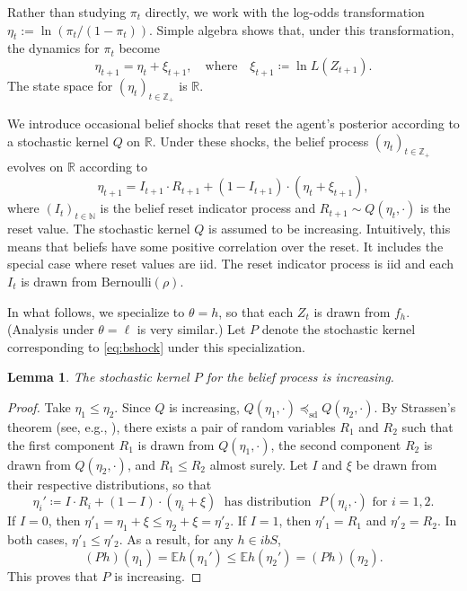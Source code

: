 \documentclass[12pt,reqno]{amsart}
\numberwithin{equation}{section}
\newtheorem{lemma}{Lemma}[section]
\theoremstyle{definition}
\newcommand{\1}{\mathbbm{1}}
\newcommand{\RR}{\mathbb{R}}
\newcommand{\NN}{\mathbb{N}}
\newcommand{\ZZ}{\mathbb{Z}}
\newcommand{\EE}{\mathbb E}
\newcommand{\precsd}{\preceq_{\textrm{sd}}}
\begin{document}
Rather than studying $\pi_t$ directly, we work with 
the log-odds transformation
$\eta_t := \ln(\pi_t/(1-\pi_t))$.
Simple algebra shows that, under this transformation, the dynamics for $\pi_t$ become
%
\begin{equation}
    \eta_{t+1} = \eta_t + \xi_{t+1},
    \quad \text{where} \quad
    \xi_{t+1} \coloneq \ln L(Z_{t+1}).
\end{equation}
%
The state space for $(\eta_t)_{t \in \ZZ_+}$ is $\RR$.

We introduce occasional belief shocks that reset the agent's posterior according
to a stochastic kernel $Q$ on $\RR$. Under these shocks,
the belief process $(\eta_t)_{t \in \ZZ_+}$ evolves on $\mathbb{R}$ according to
%
\begin{equation}\label{eq:bshock}
    \eta_{t+1} 
    = I_{t+1} \cdot R_{t+1} + (1 - I_{t+1}) \cdot (\eta_t + \xi_{t+1}),
\end{equation}
%
where $(I_t)_{t \in \NN}$ is the belief reset indicator process and
$R_{t+1} \sim Q(\eta_t, \cdot)$ is the reset value.  The stochastic kernel $Q$
is assumed to be increasing. Intuitively, this means that beliefs have some positive
correlation over the reset.  It includes the special case where reset values
are {\sc iid}. The reset indicator process is {\sc iid} and each $I_t$ is drawn
from $\mathrm{Bernoulli}(\rho)$. 

In what follows, we specialize to $\theta = h$, so that each $Z_t$ is drawn
from $f_h$. (Analysis under $\theta = \ell$ is very similar.)
Let $P$ denote the stochastic kernel corresponding to \eqref{eq:bshock}
under this specialization.

\begin{lemma}\label{l:bshock-inc}
    The stochastic kernel $P$ for the belief process is increasing.
\end{lemma}

\begin{proof}
    Take $\eta_1 \leq \eta_2$. Since $Q$ is increasing, $Q(\eta_1, \cdot)
    \precsd Q(\eta_2, \cdot)$.  By Strassen's theorem (see, e.g.,
    \cite{lindvall2002lectures}), there exists a pair of
    random variables $R_1$ and $R_2$ such that the first component $R_1$ is drawn from
    $Q(\eta_1, \cdot)$, the second component $R_2$ is drawn from $Q(\eta_2, \cdot)$, and 
    $R_1 \leq R_2$ almost surely. Let $I$ and $\xi$ be drawn from
    their respective distributions, so that
    \begin{equation*}
         \eta_i' \coloneq I \cdot R_i + (1 - I) \cdot (\eta_i + \xi)
         \; \text{ has distribution } \;
         P(\eta_i, \cdot) \text{ for } i = 1,2.
    \end{equation*}
    If $I = 0$, then $\eta'_1 =
    \eta_1 + \xi \leq \eta_2 + \xi = \eta'_2$. If $I = 1$, then $\eta'_1 = R_1$
    and $\eta'_2 = R_2$. In both cases, $\eta'_1 \leq \eta'_2$.  As a result,
    for any $h \in ibS$,
    \begin{equation*}
        (Ph)(\eta_1) = \EE h(\eta_1') 
        \leq \EE h(\eta_2') = (Ph)(\eta_2).
    \end{equation*}
    This proves that $P$ is increasing.
\end{proof}
\end{document}
